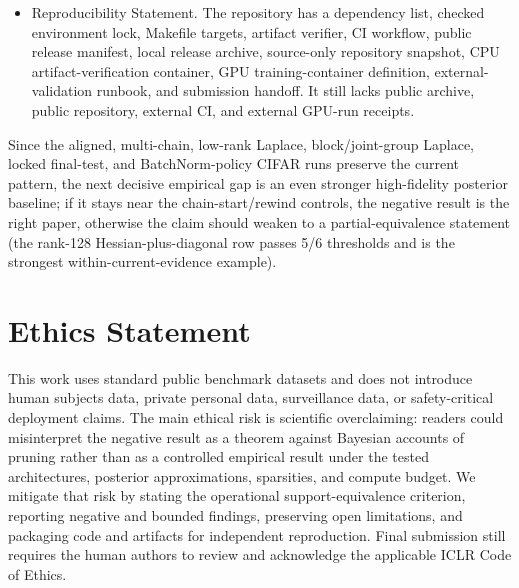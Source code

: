 \documentclass{article}
\newif\iflotteryiclr
\begin{document}
\begin{itemize}
  anatomy, predictor-mask, transfer, base compatibility, ordering,
  stratification, IMP-process, tensor+score-matched round-exclusion,
  residualized-score projection, posterior-residualized, and learned-subspace
  residualized controls do not exhaust the possible causal interventions on the
  pruning process;
  \item Reproducibility Statement. The repository has a dependency list,
  checked environment lock, Makefile targets, artifact verifier, CI workflow,
  public release manifest, local release archive, source-only repository
  snapshot, CPU artifact-verification container, GPU training-container
  definition, external-validation runbook, and submission handoff. It still
  lacks public archive, public repository, external CI, and external GPU-run
  receipts.
\end{itemize}

Since the aligned, multi-chain, low-rank Laplace, block/joint-group Laplace,
locked final-test, and BatchNorm-policy CIFAR runs preserve the current
pattern, the next decisive empirical gap is an even stronger high-fidelity
posterior baseline; if it stays near the chain-start/rewind controls, the
negative result is the right paper, otherwise the claim should weaken to a
partial-equivalence statement (the rank-128 Hessian-plus-diagonal row passes
5/6 thresholds and is the strongest within-current-evidence example).

\section*{Ethics Statement}

This work uses standard public benchmark datasets and does not introduce human
subjects data, private personal data, surveillance data, or safety-critical
deployment claims. The main ethical risk is scientific overclaiming: readers
could misinterpret the negative result as a theorem against Bayesian accounts
of pruning rather than as a controlled empirical result under the tested
architectures, posterior approximations, sparsities, and compute budget. We
mitigate that risk by stating the operational support-equivalence criterion,
reporting negative and bounded findings, preserving open limitations, and
packaging code and artifacts for independent reproduction. Final submission
still requires the human authors to review and acknowledge the applicable ICLR
Code of Ethics.

\clearpage
\iflotteryiclr
  
\else
  
\fi

\end{document}
